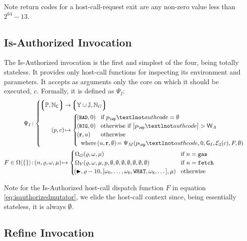 Note return codes for a host-call-request exit are any non-zero value less than $2^{64} - 13$.

\subsection{Is-Authorized Invocation}\label{sec:isauthorizedinvocation}

The Is-Authorized invocation is the first and simplest of the four, being totally stateless. It provides only host-call functions for inspecting its environment and parameters. It accepts as arguments only the core on which it should be executed, $c$. Formally, it is defined as $\Psi_I$:
\begin{align}
  \Psi_I &\colon \abracegroup{
    \tuple{\workpackage, \coreindex} &\to \tuple{\blob \cup \workerror, \gas} \\
    \tup{\wpX, c} &\mapsto \begin{cases}
      \tup{\token{BAD}, 0} &\when \wpX_\wp¬authcode = \none \\
      \tup{\token{BIG}, 0} &\otherwhen \len{\wpX_\wp¬authcode} > \mathsf{W}_A \\
      \tup{\mathbf{r}, u} &\otherwise \\
      \multicolumn{2}{l}{\where \tup{u, \mathbf{r}, \none} = \Psi_M(\wpX_\wp¬authcode, 0, \mathsf{G}_I, \fixedencode{2}{c}, F, \none)}\\
    \end{cases}\\
  } \\
  \label{eq:isauthorizedmutator}F \in \Omega\ang{\emset} &\colon
    \tup{n, \gascounter, \registers, \memory} \mapsto \begin{cases}
      \Omega_G(\gascounter, \registers, \memory) &\when n = \mathtt{gas} \\
      \Omega_Y(\gascounter, \registers, \memory, \wpX, \none, \none, \none, \none, \none, \none, \none) &\when n = \mathtt{fetch} \\
      \tup{\continue, \gascounter - 10, \sq{\registers_0, \dots, \registers_6, \mathtt{WHAT}, \registers_8, \dots}, \memory} &\otherwise
    \end{cases}
\end{align}

Note for the Is-Authorized host-call dispatch function $F$ in equation \ref{eq:isauthorizedmutator}, we elide the host-call context since, being essentially stateless, it is always $\emptyset$.

\subsection{Refine Invocation}\label{sec:refineinvocation}

